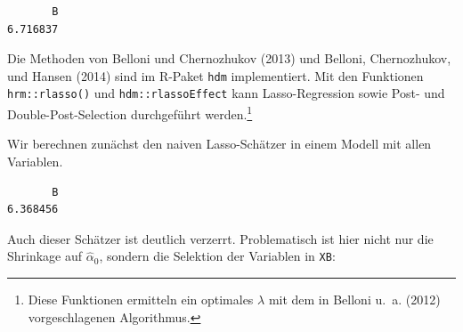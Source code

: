 \documentclass[
  a4paper,
  DIV=11,
  oneside]{scrreprt}
\newenvironment{Shaded}{\begin{snugshade}}{\end{snugshade}}
\newcommand{\AttributeTok}[1]{\textcolor[rgb]{0.40,0.45,0.13}{#1}}
\newcommand{\CommentTok}[1]{\textcolor[rgb]{0.37,0.37,0.37}{#1}}
\newcommand{\DecValTok}[1]{\textcolor[rgb]{0.68,0.00,0.00}{#1}}
\newcommand{\FunctionTok}[1]{\textcolor[rgb]{0.28,0.35,0.67}{#1}}
\newcommand{\NormalTok}[1]{\textcolor[rgb]{0.00,0.23,0.31}{#1}}
\newcommand{\OtherTok}[1]{\textcolor[rgb]{0.00,0.23,0.31}{#1}}
\newcommand{\SpecialCharTok}[1]{\textcolor[rgb]{0.37,0.37,0.37}{#1}}
\newcommand{\StringTok}[1]{\textcolor[rgb]{0.13,0.47,0.30}{#1}}
\begin{document}
\begin{verbatim}
       B 
6.716837 
\end{verbatim}

Die Methoden von Belloni und Chernozhukov (2013) und Belloni,
Chernozhukov, und Hansen (2014) sind im R-Paket \texttt{hdm}
implementiert. Mit den Funktionen \texttt{hrm::rlasso()} und
\texttt{hdm::rlassoEffect} kann Lasso-Regression sowie Post- und
Double-Post-Selection durchgeführt werden.\footnote{Diese Funktionen
  ermitteln ein optimales \(\lambda\) mit dem in Belloni u.~a. (2012)
  vorgeschlagenen Algorithmus.}

Wir berechnen zunächst den naiven Lasso-Schätzer in einem Modell mit
allen Variablen.

\begin{Shaded}
\end{Shaded}

\begin{verbatim}
       B 
6.368456 
\end{verbatim}

Auch dieser Schätzer ist deutlich verzerrt. Problematisch ist hier nicht
nur die Shrinkage auf \(\widehat{\alpha}_0\), sondern die Selektion der
Variablen in \texttt{XB}:

\begin{Shaded}
\end{Shaded}
\end{document}
